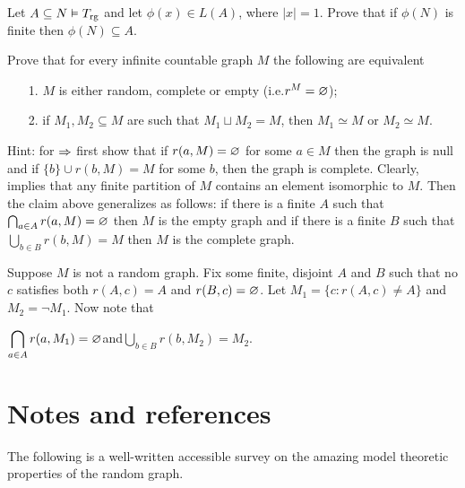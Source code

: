 \documentclass[creche.tex]{subfiles}
\begin{document}
\begin{exercise}\label{ex_rg_small_def_set}
Let $A\subseteq N\models T_{\rm rg}$ and let $\phi(x)\in L(A)$, where $|x|=1$.
Prove that if $\phi(N)$ is finite then $\phi(N)\subseteq A$.\QED
\end{exercise}

\begin{exercise}
Prove that for every infinite countable graph $M$ the following are equivalent
\begin{itemize}
\item[1.] $M$ is either random, complete or empty (i.e.\@ $r^M=\0$);
\item[2.] if $M_1,M_2\subseteq M$ are such that $M_1\sqcup M_2=M$, then $M_1\simeq M$ or $M_2\simeq M$.
\end{itemize}
Hint: for $\IMP$ first show that if $r(a,M)=\0$ for some $a\in M$ then the graph is null and if $\{b\}\cup r(b,M)=M$ for some $b$, then the graph is complete.
Clearly,  implies that any finite partition of $M$ contains an element isomorphic to $M$.
Then the claim above generalizes as follows: if there is a finite $A$ such that $\bigcap_{a\in A}r(a, M)=\0$ then $M$ is the empty graph and if there is a finite $B$ such that $\bigcup_{b\in B}r(b,M)=M$ then $M$ is the complete graph.


Suppose $M$ is not a random graph.
Fix some finite, disjoint $A$ and $B$ such that no $c$ satisfies both $r(A,c)= A$ and $r(B,c)=\0$.
Let $M_1=\{c:r(A,c)\neq A\}$ and $M_2=\neg M_1$.
 Now note that 

\hfill$\displaystyle\bigcap_{a\in A}r(a, M_1)=\0$\hfill and\hfill $\displaystyle\bigcup_{b\in B}r(b, M_2)=M_2$.\QED
\end{exercise}

\section{Notes and references}

The following is a well-written accessible survey on the amazing model theoretic properties of the random graph.

\begin{biblist}[]\normalsize
\end{biblist}
\end{document}
